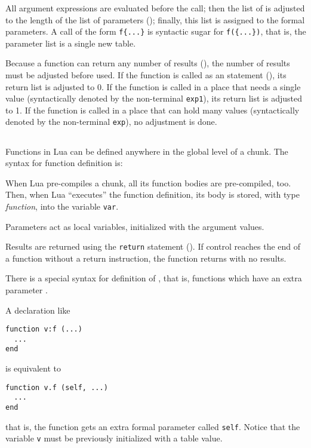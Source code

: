 \begin{Produc}
\end{Produc}%
All argument expressions are evaluated before the call;
then the list of  is adjusted to
the length of the list of parameters ();
finally, this list is assigned to the formal parameters.
A call of the form \verb'f{...}' is syntactic sugar for
\verb'f({...})', that is,
the parameter list is a single new table.

Because a function can return any number of results
(),
the number of results must be adjusted before used.
If the function is called as an statement (),
its return list is adjusted to 0.
If the function is called in a place that needs a single value
(syntactically denoted by the non-terminal \verb'exp1'),
its return list is adjusted to 1.
If the function is called in a place that can hold many values
(syntactically denoted by the non-terminal \verb'exp'),
no adjustment is done.


\subsection{}

Functions in Lua can be defined anywhere in the global level of a chunk.
The syntax for function definition is:
\begin{Produc}
\end{Produc}

When Lua pre-compiles a chunk,
all its function bodies are pre-compiled, too.
Then, when Lua ``executes'' the function definition,
its body is stored, with type {\em function},
into the variable \verb'var'.

Parameters act as local variables,
initialized with the argument values.
\begin{Produc}
\end{Produc}

Results are returned using the \verb'return' statement ().
If control reaches the end of a function without a return instruction,
the function returns with no results.

There is a special syntax for definition of ,
that is, functions which have an extra parameter .
\begin{Produc}
\end{Produc}%
A declaration like
\begin{verbatim}
function v:f (...)
  ...
end
\end{verbatim}
is equivalent to
\begin{verbatim}
function v.f (self, ...)
  ...
end
\end{verbatim}
that is, the function gets an extra formal parameter called \verb'self'.
Notice that
the variable \verb'v' must be previously initialized with a table value.


